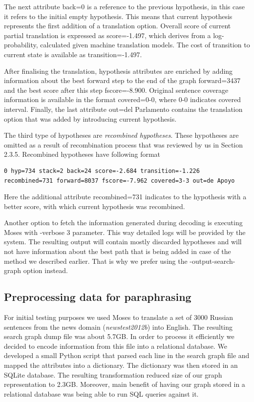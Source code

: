 The next attribute \textsf{back=0} is a reference to the previous hypothesis, in this case it refers to the initial empty hypothesis. This means that current hypothesis represents the first addition of a translation option. Overall score of current partial translation is expressed as \textsf{score=-1.497}, which derives from a log-probability, calculated given machine translation models. The cost of transition to current state is available as \textsf{transition=-1.497}. 

After finalising the translation, hypothesis attributes are enriched by adding information about the best forward step to the end of the graph \textsf{forward=3437} and the best score after this step \textsf{fscore=-8.900}. Original sentence coverage information is available in the format \textsf{covered=0-0}, where \textsf{0-0} indicates covered interval. Finally, the last attribute \textsf{out=del Parlamento} contains the translation option that was added by introducing current hypothesis.

The third type of hypotheses are \textit{recombined hypotheses}. These hypotheses are omitted as a result of recombination process that was reviewed by us in Section 2.3.5. Recombined hypotheses have following format

\begin{verbatim}
0 hyp=734 stack=2 back=24 score=-2.684 transition=-1.226 
recombined=731 forward=8037 fscore=-7.962 covered=3-3 out=de Apoyo
\end{verbatim}

Here the additional attribute \textsf{recombined=731} indicates to the hypothesis with a better score, with which current hypothesis was recombined.

Another option to fetch the information generated during decoding is executing Moses with \textsf{-verbose 3} parameter. This way detailed logs will be provided by the system. The resulting output will contain mostly discarded hypotheses and will not have information about the best path that is being added in case of the method we described earlier. That is why we prefer using the \textsf{-output-search-graph} option instead.

\subsection{Preprocessing data for paraphrasing}

For initial testing purposes we used Moses to translate a set of 3000 Russian sentences from the news domain (\textit{newstest2012b}) into English. The resulting search graph dump file was about 5.7GB. In order to process it efficiently we decided to encode information from this file into a relational database. We developed a small Python script that parsed each line in the search graph file and mapped the attributes into a dictionary. The dictionary was then stored in an SQLite database. The resulting transformation reduced size of our graph representation to 2.3GB. Moreover, main benefit of having our graph stored in a relational database was being able to run SQL queries against it. 

